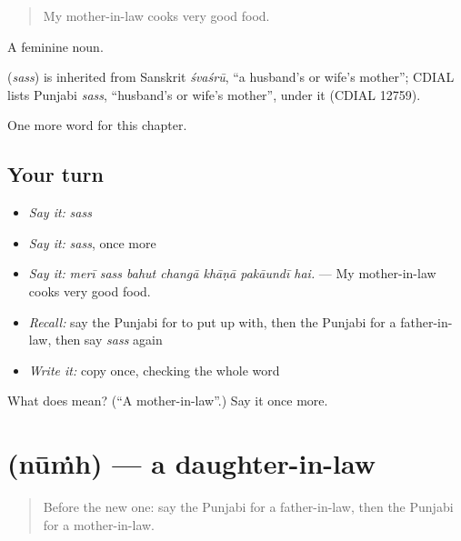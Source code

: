 \begin{quote}
My mother-in-law cooks very good food.
\end{quote}

A feminine noun.

\begin{cousinweb}
\textbf{} (\emph{sass}) is inherited from Sanskrit \emph{śvaśrū}, \textquotedblleft{}a husband's or wife's mother\textquotedblright{}; CDIAL lists Punjabi \emph{sass}, \textquotedblleft{}husband's or wife's mother\textquotedblright{}, under it (CDIAL 12759).
\end{cousinweb}

\begin{grammarlens}[title={What you've built}]
One more word for this chapter.
\end{grammarlens}

\subsection*{Your turn}
\begin{itemize}
\raggedright
  \item \emph{Say it:} \emph{sass}
  \item \emph{Say it:} \emph{sass}, once more
  \item \emph{Say it:} \emph{merī sass bahut changā khāṇā pakāundī hai.} — My mother-in-law cooks very good food.
  \item \emph{Recall:} say the Punjabi for to put up with, then the Punjabi for a father-in-law, then say \emph{sass} again
  \item \emph{Write it:} copy \textbf{} once, checking the whole word
\end{itemize}

\begin{tcolorbox}[breakable,colback=teal!4,colframe=teal!35!black,title={Before you move on}]
What does  mean? (\textquotedblleft{}A mother-in-law\textquotedblright{}.) Say it once more.
\end{tcolorbox}
\section[\texorpdfstring{\pa{ਨੂੰਹ} (nūṁh)}{ਨੂੰਹ (nūṁh)}]{ (nūṁh) — a daughter-in-law}

\label{lesson:PA-C329-numh}



\begin{quote}
Before the new one: say the Punjabi for a father-in-law, then the Punjabi for a mother-in-law.
\end{quote}

